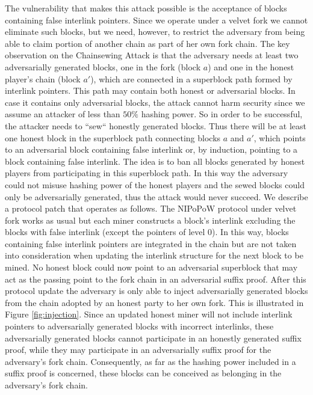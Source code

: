 \documentclass[11pt,a4paper]{article}
\begin{document}
The vulnerability that makes this attack possible is the acceptance of blocks containing false interlink pointers. Since we operate under a velvet fork we cannot eliminate such blocks, but we need, however, to restrict the adversary from being able to claim portion of another chain as part of her own fork chain. 
The key observation on the Chainsewing Attack is that the adversary needs at least two adversarially generated blocks, one in the fork (block $a$) and one in the honest player's chain (block $a'$), which are connected in a superblock path formed by interlink pointers. This path may contain both honest or adversarial blocks. 
In case it contains only adversarial blocks, the attack cannot harm security since we assume an attacker of less than $50\%$ hashing power.
So in order to be successful, the attacker needs to ``sew`` honestly generated blocks. Thus there will be at least one honest block in the superblock path connecting blocks $a$ and $a'$, which points to an adversarial block containing false interlink or, by induction, pointing to a block containing false interlink.
The idea is to ban all blocks generated by honest players from participating in this superblock path. In this way the adversary could not misuse hashing power of the honest players and the sewed blocks could only be adversarially generated, thus the attack would never succeed. 
We describe a protocol patch that operates as follows. The NIPoPoW protocol under velvet fork works as usual but each miner constructs a block's interlink excluding the blocks with false interlink (except the pointers of level 0). In this way, blocks containing false interlink pointers are integrated in the chain but are not taken into consideration when updating the interlink structure for the next block to be mined. No honest block could now point to an adversarial superblock that may act as the passing point to the fork chain in an adversarial suffix proof. 
After this protocol update the adversary is only able to inject adversarially generated blocks from the chain adopted by an honest party to her own fork. This is illustrated in Figure \ref{fig:injection}.
Since an updated honest miner will not include interlink pointers to adversarially generated blocks with incorrect interlinks, these adversarially generated blocks cannot participate in an honestly generated suffix proof, while they may participate in an adversarially suffix proof for the adversary's fork chain. Consequently, as far as the hashing power included in a suffix proof is concerned, these blocks can be conceived as belonging in the adversary's fork chain. 
\end{document}
